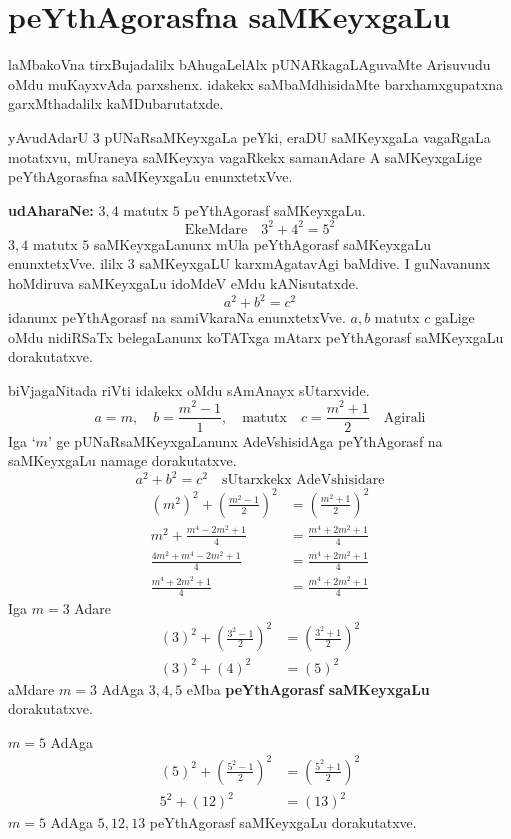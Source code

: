 \chapter{peYthAgorasfna saMKeyxgaLu}
\vskip -20pt

laMbakoVna tirxBujadalilx bAhugaLelAlx pUNARkagaLAguvaMte Arisuvudu oMdu muKayxvAda parxshenx. idakekx saMbaMdhisidaMte barxhamxgupatxna garxMthadalilx kaMDubarutatxde.

yAvudAdarU $3$ pUNaRsaMKeyxgaLa peYki, eraDU saMKeyxgaLa vagaRgaLa motatxvu, mUraneya saMKeyxya vagaRkekx samanAdare A saMKeyxgaLige peYthAgorasfna saMKeyxgaLu enunxtetxVve.

\textbf{udAharaNe:} $3,4$ matutx $5$  peYthAgorasf saMKeyxgaLu.
$$
\text{EkeMdare}\quad 3^2+4^2=5^2
$$
$3,4$ matutx $5$ saMKeyxgaLanunx mUla peYthAgorasf saMKeyxgaLu enunxtetxVve. ililx $3$ saMKeyx\-gaLU karxmAgatavAgi baMdive. I guNavanunx hoMdiruva saMKeyxgaLu idoMdeV eMdu kANisutatxde.
$$
a^2+b^2 = c^2
$$
idanunx peYthAgorasf  na samiVkaraNa enunxtetxVve. $a,b$ matutx $c$ gaLige oMdu nidiRSaTx belegaLanunx koTATxga mAtarx peYthAgorasf saMKeyxgaLu dorakutatxve.

biVjagaNitada riVti idakekx oMdu sAmAnayx sUtarxvide.
$$
a=m, \quad b= \frac{m^2-1}{1}, \quad\text{matutx} \quad c=\frac{m^2+1}{2} \quad \text{Agirali}
$$
Iga `$m$' ge pUNaRsaMKeyxgaLanunx AdeVshisidAga peYthAgorasf na saMKeyxgaLu namage dorakutatxve.
$$
a^2+b^2=c^2 \quad\text{sUtarxkekx AdeVshisidare}
$$
\begin{align*}
\left(m^2\right)^2+\left(\frac{m^2-1}{2}\right)^2 &= \left(\frac{m^2+1}{2}\right)^2\\
m^2+ \frac{m^4-2m^2+1}{4} &= \frac{m^4+2m^2+1}{4}\\
\frac{4m^2+m^4-2m^2+1}{4} &= \frac{m^4+2m^2+1}{4}\\
\frac{m^4+2m^2+1}{4} &= \frac{m^4+2m^2+1}{4}
\end{align*}
Iga $m=3$ Adare
\begin{align*}
(3)^2+\left(\frac{3^{2}-1}{2}\right)^2 &= \left(\frac{3^2+1}{2}\right)^2\\
(3)^2+(4)^2 &= (5)^2
\end{align*}
aMdare $m=3$ AdAga $3,4,5$ eMba {\bf peYthAgorasf saMKeyxgaLu} dorakutatxve.

$m=5$ \quad AdAga
\begin{align*}
(5)^2 + \left(\frac{5^2-1}{2}\right)^2 &= \left(\frac{5^2+1}{2}\right)^2\\
5^2 +(12)^2 &= (13)^2
\end{align*}
$m=5$ AdAga $5,12,13$ peYthAgorasf saMKeyxgaLu dorakutatxve.

